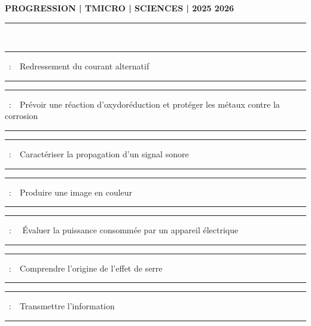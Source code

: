 \documentclass[11pt,a4paper]{article}
\newcounter{numchap}%
\newcommand{\chap}[1]{%
\addtocounter{numchap}{1}%
\textcolor{black}{Chapitre\,\thenumchap\,}\,#1%
}
\newcommand{\chapitre}[1]
{


\hrule
\vspace{5mm}
\large{ \chap~:~~#1 }
\vspace{5mm}
\hrule

\vfill 

}
\begin{document}
\center \LARGE{ \textbf{PROGRESSION | TMICRO | SCIENCES | 2025 2026}}
\\[0,5cm]

\normalsize

\hrule\

\vspace{1cm}

\begin{center}


\chapitre{Redressement du courant alternatif}
\chapitre{Prévoir une réaction d'oxydoréduction et protéger les métaux contre la corrosion}
\chapitre{Caractériser la propagation d'un signal sonore}
\chapitre{Produire une image en couleur}
\chapitre{ Évaluer la puissance consommée par un appareil électrique}
\chapitre{Comprendre l'origine de l'effet de serre}
\chapitre{Transmettre l'information}



\end{center}
\end{document}
